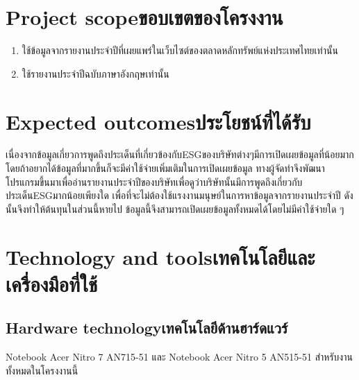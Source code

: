 \section{\ifenglish Project scope\else ขอบเขตของโครงงาน\fi}

\begin{enumerate} 
    \item
    ใช้ข้อมูลจากรายงานประจำปีที่เผยแพร่ในเว็บไซต์ของตลาดหลักทรัพย์แห่งประเทศไทยเท่านั้น
    \item
    ใช้รายงานประจำปีฉบับภาษาอังกฤษเท่านั้น
\end{enumerate}



\section{\ifenglish Expected outcomes\else ประโยชน์ที่ได้รับ\fi}

    \enskip \enskip \enskip เนื่องจากข้อมูลเกี่ยวการพูดถึงประเด็นที่เกี่ยวข้องกับESGของบริษัทต่างๆมีการเปิดเผยข้อมูลที่น้อยมาก
    โดยถ้าอยากได้ข้อมูลที่มากขึ้นก็จะมีค่าใช้จ่ายเพิ่มเติมในการเปิดเผยข้อมูล 
    ทางผู้จัดทำจึงพัฒนาโปรแกรมขึ้นมาเพื่ออ่านรายงานประจำปีของบริษัทเพื่อดูว่าบริษัทนั้นมีการพูดถึงเกี่ยวกับประเด็นESGมากน้อยเพียงใด
    เพื่อที่จะไม่ต้องใช้แรงงานมนุษย์ในการหาข้อมูลจากรายงานประจำปี
    ดังนั้นจึงทำให้ต้นทุนในส่วนนี้หายไป 
    ข้อมูลนี้จึงสามารถเปิดเผยข้อมูลทั้งหมดได้โดยไม่มีค่าใช้จ่ายใด ๆ

\section{\ifenglish Technology and tools\else เทคโนโลยีและเครื่องมือที่ใช้\fi}

\subsection{\ifenglish Hardware technology\else เทคโนโลยีด้านฮาร์ดแวร์\fi}

\enskip \enskip \enskip Notebook Acer Nitro 7 AN715-51 และ Notebook Acer Nitro 5 AN515-51 สำหรับงานทั้งหมดในโครงงานนี้

